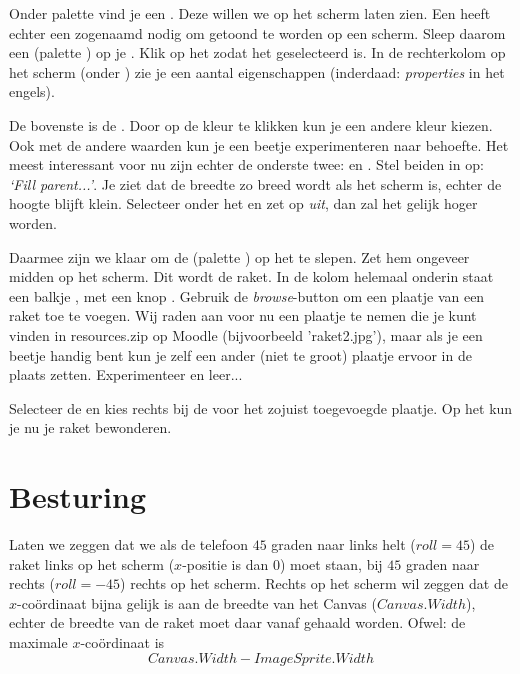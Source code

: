 Onder palette  vind je een . Deze willen we op het scherm laten zien. Een 
\linebreak {} heeft echter een zogenaamd  nodig om getoond te worden op een scherm. Sleep daarom een  (palette ) op je . Klik op het  zodat het geselecteerd is. In de rechterkolom op het scherm (onder ) zie je een aantal eigenschappen (inderdaad: \emph{properties} in het engels). 

De bovenste is de . Door op de kleur te klikken kun je een andere kleur kiezen. Ook met de andere waarden kun je een beetje experimenteren naar behoefte. Het meest interessant voor nu zijn echter de onderste twee:  en . Stel beiden in op: \emph{`Fill parent...'}. Je ziet dat de breedte zo breed wordt als het scherm is, echter de hoogte blijft klein. Selecteer onder  het  en zet  op \emph{uit}, dan zal het  gelijk hoger worden. 

Daarmee zijn we klaar om de  (palette ) op het  te slepen. Zet hem ongeveer midden op het scherm. Dit wordt de raket. In de kolom  helemaal onderin staat een balkje , met een knop . Gebruik de \emph{browse}-button om een plaatje van een raket toe te voegen. Wij raden aan voor nu een plaatje te nemen die je kunt vinden in resources.zip op Moodle (bijvoorbeeld 'raket2.jpg'), maar als je een beetje handig bent kun je zelf een ander (niet te groot) plaatje ervoor in de plaats zetten. Experimenteer en leer... 

Selecteer de  en kies rechts bij de  voor  het zojuist toegevoegde plaatje. Op het  kun je nu je raket bewonderen. 

\section{Besturing}

Laten we zeggen dat we als de telefoon $45$ graden naar links helt ($roll=45$) de raket links op het scherm ($x$-positie is dan $0$) moet staan, bij $45$ graden naar rechts ($roll= -45$) rechts op het scherm. Rechts op het scherm wil zeggen dat de $x$-co\"ordinaat bijna gelijk is aan de breedte van het Canvas ($Canvas.Width$), echter de breedte van de raket moet daar vanaf gehaald worden. Ofwel: de maximale $x$-co\"ordinaat is 
\[
     Canvas.Width - ImageSprite.Width
\]

